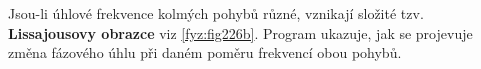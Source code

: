 {      Jsou-li úhlové frekvence kolmých pohybů různé, vznikají složité tzv. \textbf{Lissajousovy 
      obrazce} viz \ref{fyz:fig226b}. Program ukazuje, jak se projevuje změna fázového 
      úhlu při daném poměru frekvencí obou pohybů.

        
        \begin{lstlisting}[caption=\texttt{Lissajous.m} vykreslí skládání harmonických pohybů v 
          kolmých směrech.]
        \end{lstlisting}

} %
\printbibliography[title={Seznam literatury},heading=subbibliography]
